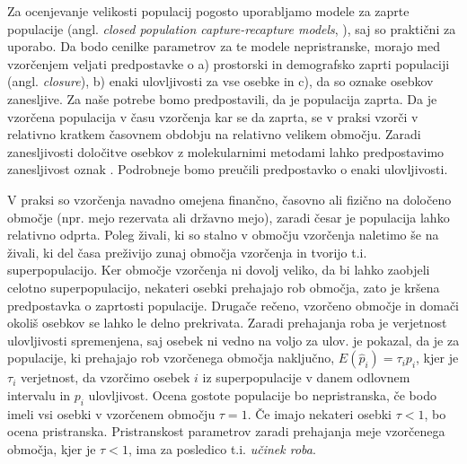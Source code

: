 \documentclass[a4paper]{article}
\begin{document}
Za ocenjevanje velikosti populacij pogosto uporabljamo modele za zaprte populacije (angl. \emph{closed population capture-recapture models}, \citet{coochwhite2012}), saj so praktični za uporabo. Da bodo cenilke parametrov za te modele nepristranske, morajo med vzorčenjem veljati predpostavke o a) prostorski in demografsko zaprti populaciji (angl. \emph{closure}), b) enaki ulovljivosti za vse osebke in c), da so oznake osebkov zanesljive. Za naše potrebe bomo predpostavili, da je populacija zaprta. Da je vzorčena populacija v času vzorčenja kar se da zaprta, se v praksi vzorči v relativno kratkem časovnem obdobju na relativno velikem območju. Zaradi zanesljivosti določitve osebkov z molekularnimi metodami lahko predpostavimo zanesljivost oznak \citep{beja-pereira-et-al-2009}. Podrobneje bomo preučili predpostavko o enaki ulovljivosti.

V praksi so vzorčenja navadno omejena finančno, časovno ali fizično na določeno območje (npr. mejo rezervata ali državno mejo), zaradi česar je populacija lahko relativno odprta. Poleg živali, ki so stalno v območju vzorčenja naletimo še na živali, ki del časa preživijo zunaj območja vzorčenja in tvorijo t.i. superpopulacijo. Ker območje vzorčenja ni dovolj veliko, da bi lahko zaobjeli celotno superpopulacijo, nekateri osebki prehajajo rob območja, zato je kršena predpostavka o zaprtosti populacije. Drugače rečeno, vzorčeno območje in domači okoliš osebkov se lahko le delno prekrivata. Zaradi prehajanja roba je verjetnost ulovljivosti spremenjena, saj osebek ni vedno na voljo za ulov. \citet{kendall1999} je pokazal, da je za populacije, ki prehajajo rob vzorčenega območja naključno, $E(\hat{p}_i) = \tau_i p_i$, kjer je $\tau_i$ verjetnost, da vzorčimo osebek $i$ iz superpopulacije v danem odlovnem intervalu in $p_i$ ulovljivost. Ocena gostote populacije bo nepristranska, če bodo imeli vsi osebki v vzorčenem območju $\tau = 1$. Če imajo nekateri osebki $\tau < 1$, bo ocena pristranska. Pristranskost parametrov zaradi prehajanja meje vzorčenega območja, kjer je $\tau < 1$, ima za posledico t.i. \emph{učinek roba}.
\end{document}

